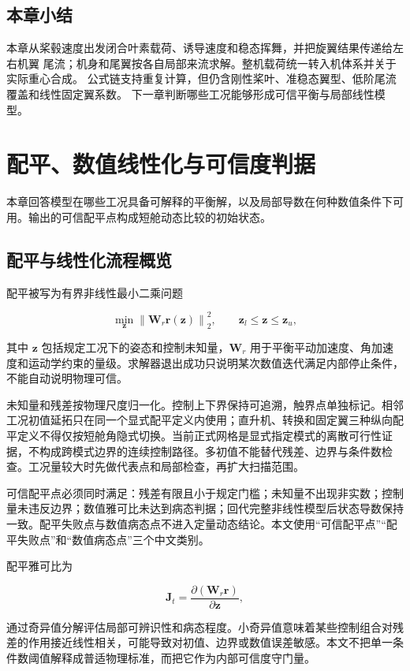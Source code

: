\documentclass[UTF8,12pt,oneside,openany,fontset=windows]{ctexbook}
\begin{document}
\section{本章小结}

本章从桨毂速度出发闭合叶素载荷、诱导速度和稳态挥舞，并把旋翼结果传递给左右机翼 尾流；机身和尾翼按各自局部来流求解。整机载荷统一转入机体系并关于实际重心合成。 公式链支持重复计算，但仍含刚性桨叶、准稳态翼型、低阶尾流覆盖和线性固定翼系数。 下一章判断哪些工况能够形成可信平衡与局部线性模型。

\chapter{配平、数值线性化与可信度判据}

本章回答模型在哪些工况具备可解释的平衡解，以及局部导数在何种数值条件下可用。输出的可信配平点构成短舱动态比较的初始状态。

\section{配平与线性化流程概览}

配平被写为有界非线性最小二乘问题

$$\min_{\mathbf{z}}\left\|\mathbf{W}_r\mathbf{r}(\mathbf{z})\right\|_2^2, \qquad \mathbf{z}_l\leq\mathbf{z}\leq\mathbf{z}_u,$$

其中 $\mathbf{z}$ 包括规定工况下的姿态和控制未知量，$\mathbf{W}_r$ 用于平衡平动加速度、角加速度和运动学约束的量级。求解器退出成功只说明某次数值迭代满足内部停止条件，不能自动说明物理可信。

未知量和残差按物理尺度归一化。控制上下界保持可追溯，触界点单独标记。相邻工况初值延拓只在同一个显式配平定义内使用；直升机、转换和固定翼三种纵向配平定义不得仅按短舱角隐式切换。当前正式网格是显式指定模式的离散可行性证据，不构成跨模式边界的连续控制路径。多初值不能替代残差、边界与条件数检查。工况量较大时先做代表点和局部检查，再扩大扫描范围。

可信配平点必须同时满足：残差有限且小于规定门槛；未知量不出现非实数；控制量未违反边界；数值雅可比未达到病态判据；回代完整非线性模型后状态导数保持一致。配平失败点与数值病态点不进入定量动态结论。本文使用“可信配平点”“配平失败点”和“数值病态点”三个中文类别。

配平雅可比为

$$\mathbf{J}_t=\frac{\partial(\mathbf{W}_r\mathbf{r})}{\partial\mathbf{z}},$$

通过奇异值分解评估局部可辨识性和病态程度。小奇异值意味着某些控制组合对残差的作用接近线性相关，可能导致对初值、边界或数值误差敏感。本文不把单一条件数阈值解释成普适物理标准，而把它作为内部可信度守门量。
\end{document}
